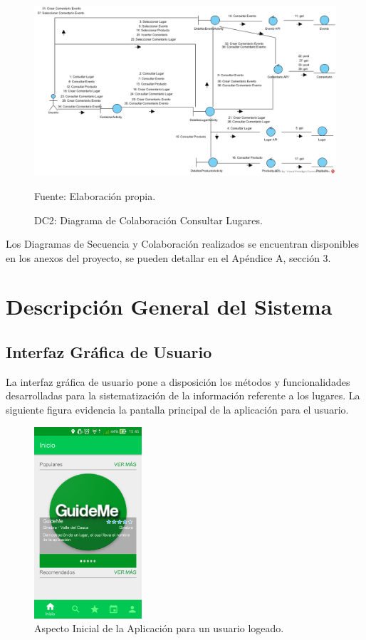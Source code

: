 \documentclass[12pt,letterpaper,openany]{book}
\begin{document}
\begin{figure}[H]
\begin{center}
\includegraphics[width=14cm]{./imagenes/DC/DC_consultar_lugar}
\caption{DC2: Diagrama de Colaboración Consultar Lugares.}
\centering Fuente: Elaboración propia.
\end{center}
\end{figure}

Los Diagramas de Secuencia y Colaboración realizados se encuentran disponibles en los anexos del proyecto, se pueden detallar en el Apéndice A, sección 3.

\section{Descripción General del Sistema}
\subsection{Interfaz Gráfica de Usuario}
La interfaz gráfica de usuario pone a disposición los métodos y funcionalidades desarrolladas para la sistematización de la información referente a los lugares. La siguiente figura evidencia la pantalla principal de la aplicación para el usuario.

\begin{figure}[H]
\begin{center}
\includegraphics[width=4cm]{./imagenes/gui}
\caption{Aspecto Inicial de la Aplicación para un usuario logeado.}
\end{center}
\end{figure}
\end{document}
